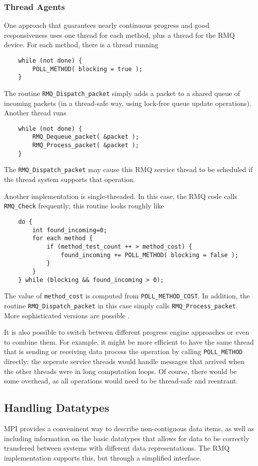\documentclass{article}
\let\code=\texttt
\begin{document}
\subsubsection{Thread Agents}
One approach that guarantees nearly continuous progress and good
responsiveness uses one thread for each method, plus a thread for the RMQ
device.  For each method, there is a thread running
\begin{verbatim}
    while (not done) {
        POLL_METHOD( blocking = true );
    }
\end{verbatim}
The routine \code{RMQ\_Dispatch\_packet} simply adds a packet to a shared queue
of incoming packets (in a thread-safe way, using lock-free queue update
operations).  Another thread runs 
\begin{verbatim}
    while (not done) {
        RMQ_Dequeue_packet( &packet );
        RMQ_Process_packet( &packet );
    }
\end{verbatim}
The \code{RMQ\_Dispatch\_packet} may cause this RMQ service thread to be
scheduled if the thread system supports that operation.

Another implementation is single-threaded.  In this case, the RMQ code
calls \code{RMQ\_Check} frequently; this routine looks roughly like
\begin{verbatim}
    do { 
        int found_incoming=0;
        for each method {
            if (method_test_count ++ > method_cost) {
                found_incoming += POLL_METHOD( blocking = false );
            }
        }
    } while (blocking && found_incoming > 0);
\end{verbatim}
The value of \code{method\_cost} is computed from \code{POLL\_METHOD\_COST}.
In addition, the routine \code{RMQ\_Dispatch\_packet} in this case simply calls
\code{RMQ\_Process\_packet}.  More sophisticated versions are possible
\cite{isca92*256}. 

It is also possible to switch between different progress engine approaches or
even to combine them.  For example, it might be more efficient to have the
same thread that is sending or receiving data process the operation by calling
\code{POLL\_METHOD} directly; the seperate service threads would handle
messages that arrived when the other threads were in long computation loops.
Of course, there would be some overhead, as all operations would need to be
thread-safe and reentrant.

\subsection{Handling Datatypes}
\label{sec:rmq-datatypes}
MPI provides a conveninent way to describe non-contiguous data items, as well
as including information on the basic datatypes that allows for data to be
correctly transfered between systems with different data representations.  The
RMQ implementation supports this, but through a simplified interface.
\end{document}
